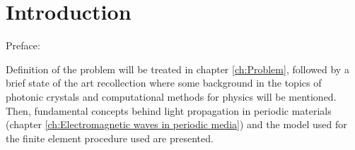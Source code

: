 \chapter{Introduction}

Preface:

Definition of the problem will be treated in chapter \ref{ch:Problem}, followed by a brief state of the art recollection where some background in the topics of photonic crystals and computational methods for physics will be mentioned. Then, fundamental concepts behind light propagation in periodic materials (chapter \ref{ch:Electromagnetic waves in periodic media})  and the model used for the finite element procedure used are presented.